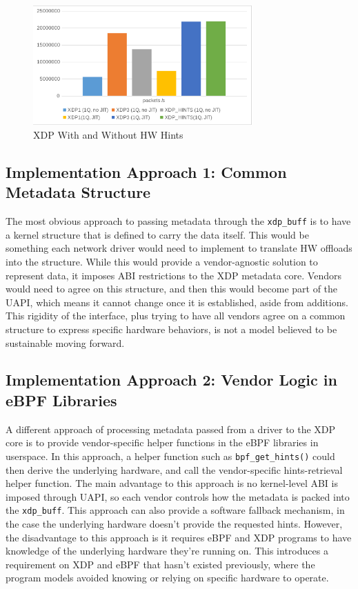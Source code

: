 \documentclass[letterpaper]{article}
\begin{document}
\begin{figure}[h]
\includegraphics[width=3.31in]{xdp-programs-performance.png}
\caption{XDP With and Without HW Hints}
\label{xdp-performance}
\end{figure}

\subsection{Implementation Approach 1: Common Metadata Structure}

The most obvious approach to passing metadata through the {\small \texttt{xdp\_buff}} is to have a kernel structure that is defined to carry the data itself. This would be something each network driver would need to implement to translate HW offloads into the structure. While this would provide a vendor-agnostic solution to represent data, it imposes ABI restrictions to the XDP metadata core. Vendors would need to agree on this structure, and then this would become part of the UAPI, which means it cannot change once it is established, aside from additions. This rigidity of the interface, plus trying to have all vendors agree on a common structure to express specific hardware behaviors, is not a model believed to be sustainable moving forward.

\subsection{Implementation Approach 2: Vendor Logic in eBPF Libraries}

A different approach of processing metadata passed from a driver to the XDP core is to provide vendor-specific helper functions in the eBPF libraries in userspace. In this approach, a helper function such as {\small \texttt{bpf\_get\_hints()}} could then derive the underlying hardware, and call the vendor-specific hints-retrieval helper function. The main advantage to this approach is no kernel-level ABI is imposed through UAPI, so each vendor controls how the metadata is packed into the {\small \texttt{xdp\_buff}}. This approach can also provide a software fallback mechanism, in the case the underlying hardware doesn't provide the requested hints.
\newline
\indent However, the disadvantage to this approach is it requires eBPF and XDP programs to have knowledge of the underlying hardware they're running on. This introduces a requirement on XDP and eBPF that hasn't existed previously, where the program models avoided knowing or relying on specific hardware to operate.
\end{document}
